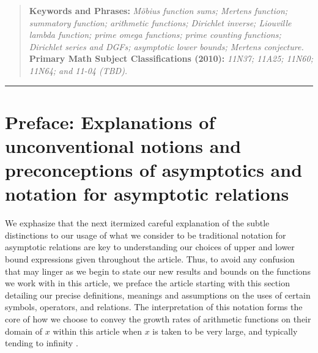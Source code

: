 \documentclass[11pt,reqno,a4letter]{article}
\numberwithin{figure}{section}
\numberwithin{table}{section}
\newcommand{\cf}{\textit{cf.\ }}
\theoremstyle{plain}
\numberwithin{theorem}{section}
\theoremstyle{definition}
\begin{document}
\begin{abstract}
\bigskip 
\noindent
\textbf{Keywords and Phrases:} {\it M\"obius function sums; Mertens function; summatory function; 
                                    arithmetic functions; 
                                    Dirichlet inverse; Liouville lambda function; prime omega functions; 
                                    prime counting functions; Dirichlet series and DGFs; 
                                    asymptotic lower bounds; Mertens conjecture. } \\ 
\textbf{Primary Math Subject Classifications (2010):} {\it 11N37; 11A25; 11N60; 11N64; and 11-04 (TBD). } 
\end{abstract} 

\bigskip\hrule\bigskip

\newpage
\label{Appendix_Glossary_NotationConvs}
     \vskip 0in
     \printglossary[type={symbols},
                    title={Reference on special notation and other conventions},
                    style={glossstyleSymbol},
                    nogroupskip=true]



\newpage
\section{Preface: Explanations of unconventional notions and preconceptions of asymptotics and 
         notation for asymptotic relations} 

We exphasize that the next itermized careful explanation of the subtle distinctions to our usage of 
what we consider to be traditional notation for asymptotic relations are key to 
understanding our choices of upper and lower bound expressions given throughout the article. 
Thus, to avoid any confusion that may linger as we begin to state our new results and bounds on the 
functions we work with in this article, we preface the article starting with this section detailing 
our precise definitions, meanings and assumptions on the uses of certain symbols, operators, and 
relations. The interpretation of this notation forms the core of how we choose 
to convey the growth rates of arithmetic functions on their domain of $x$ within this article 
when $x$ is taken to be very large, and typically tending to infinity 
\cite[\cf \S 2]{NISTHB} \cite{ACOMB-BOOK}. 
\end{document}
